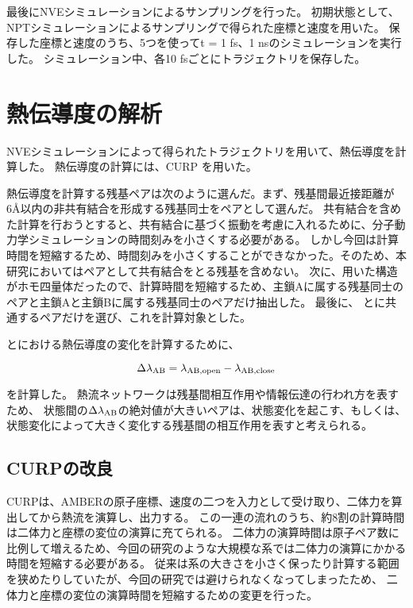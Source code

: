 最後にNVEシミュレーションによるサンプリングを行った。
初期状態として、NP\gamma Tシミュレーションによるサンプリングで得られた座標と速度を用いた。
保存した座標と速度のうち、5つを使って\Delta t = 1 fs、1 nsのシミュレーションを実行した。
シミュレーション中、各10 fsごとにトラジェクトリを保存した。

\section{熱伝導度の解析}

NVEシミュレーションによって得られたトラジェクトリを用いて、熱伝導度を計算した。
熱伝導度の計算には、CURP\autocite{ishikura_energy_2015,ota_energy_2019,yamatoComputationalStudyThermal2022,wangSiteselectiveHeatCurrent2023} を用いた。

熱伝導度を計算する残基ペアは次のように選んだ。まず、残基間最近接距離が6\AA 以内の非共有結合を形成する残基同士をペアとして選んだ。
共有結合を含めた計算を行おうとすると、共有結合に基づく振動を考慮に入れるために、分子動力学シミュレーションの時間刻みを小さくする必要がある。
しかし今回は計算時間を短縮するため、時間刻みを小さくすることができなかった。そのため、本研究においてはペアとして共有結合をとる残基を含めない。
次に、用いた構造がホモ四量体だったので、計算時間を短縮するため、主鎖Aに属する残基同士のペアと主鎖Aと主鎖Bに属する残基同士のペアだけ抽出した。
最後に、 \openFortyTwo と\closeFortyTwo に共通するペアだけを選び、これを計算対象とした。

\openFortyTwo と\closeFortyTwo における熱伝導度の変化を計算するために、

\begin{equation}
  \label{eq:thermal_conductivity_difference}
  \Delta \lambda_{\rm{AB}} = \lambda_{\rm{AB, open}} - \lambda_{\rm{AB, close}}
\end{equation}

を計算した。
熱流ネットワークは残基間相互作用や情報伝達の行われ方を表すため、
状態間の$\Delta \lambda_{\rm{AB}}$の絶対値が大きいペアは、状態変化を起こす、もしくは、状態変化によって大きく変化する残基間の相互作用を表すと考えられる。

\subsection{CURPの改良}\label{sec:curp}

CURPは、AMBERの原子座標、速度の二つを入力として受け取り、二体力を算出してから熱流を演算し、出力する。
この一連の流れのうち、約8割の計算時間は二体力と座標の変位の演算に充てられる。
二体力の演算時間は原子ペア数に比例して増えるため、今回の研究のような大規模な系では二体力の演算にかかる時間を短縮する必要がある。
従来は系の大きさを小さく保ったり計算する範囲を狭めたりしていたが、今回の研究では避けられなくなってしまったため、
二体力と座標の変位の演算時間を短縮するための変更を行った。

